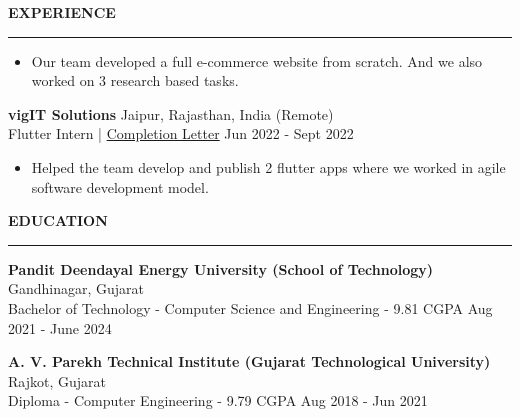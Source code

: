 \documentclass[a4paper, 11pt]{article}
\newenvironment{resumeSection}[1]
{
    \MakeUppercase{\Large\textbf{#1}}
    \medskip
    \hrule
    \begin{list}{}
    {
        \setlength\itemsep{-0.3em}
        \setlength\leftmargin{0em}
    }
    \vspace{-1em}
    \item[]
}
{   \end{list}  }
\newenvironment{sectionItems}
{
    \vspace{-0.5em}
    \begin{itemize}
    \setlength{\itemsep}{-0.7em}
}
{
    \end{itemize}
}
\begin{document}
\begin{resumeSection}{Experience}
    \begin{sectionItems}
        \item Our team developed a full e-commerce website from scratch. And we also worked on 3 research based tasks.
    \end{sectionItems}
    
    \item 
    \textbf{vigIT Solutions}
    \hfill
    Jaipur, Rajasthan, India (Remote)
    \\
    Flutter Intern | \href{https://drive.google.com/file/d/1yF5baJ-uIWpwAHL0Sd-CwycYHjbyFumW/view?usp=sharing}{Completion Letter}
    \hfill
    Jun 2022 - Sept 2022
    
    \begin{sectionItems}
        \item Helped the team develop and publish 2 flutter apps where we worked in agile software development model.
    \end{sectionItems}
    
\end{resumeSection}

\medskip
\begin{resumeSection}{Education}
    \item
    \textbf{Pandit Deendayal Energy University (School of Technology)}
    \hfill
    Gandhinagar, Gujarat
    \\
    Bachelor of Technology - Computer Science and Engineering - 9.81 CGPA
    \hfill
    {Aug 2021 - June 2024}

    \item
    \textbf{A. V. Parekh Technical Institute (Gujarat Technological University)}
    \hfill
    Rajkot, Gujarat
    \\
    Diploma - Computer Engineering - 9.79 CGPA
    \hfill
    {Aug 2018 - Jun 2021}
\end{resumeSection}
\end{document}
